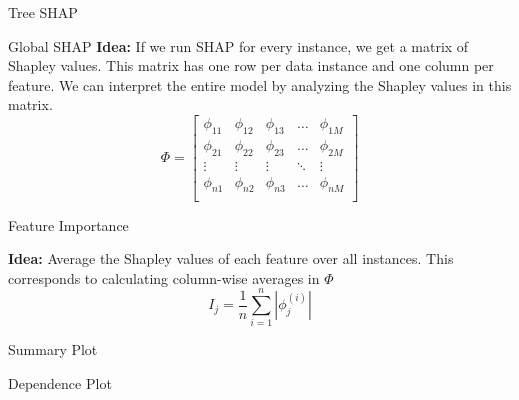 \documentclass[10pt,compress,t,notes=noshow, xcolor=table]{beamer}
\begin{document}
\begin{vbframe}{Tree SHAP}

\end{vbframe}

 \begin{vbframe}{Global SHAP}
\textbf{Idea: }
If we run SHAP for every instance, we get a matrix of Shapley values. This matrix has one row per data instance and one column per feature. We can interpret the entire model by analyzing the Shapley values in this matrix.
\vspace{2cm}
$$
\Phi =
\begin{bmatrix}
    \phi_{11} & \phi_{12} & \phi_{13} & \dots  & \phi_{1M} \\
    \phi_{21} & \phi_{22} & \phi_{23} & \dots  & \phi_{2M} \\
    \vdots & \vdots & \vdots & \ddots & \vdots \\
    \phi_{n1} & \phi_{n2} & \phi_{n3} & \dots  & \phi_{nM} \\
\end{bmatrix}
$$

 \end{vbframe}

 \begin{vbframe}{Feature Importance}
 
\textbf{Idea:} Average the Shapley values of each feature over all instances. This corresponds to calculating column-wise averages in $\Phi$
$$
I_{j}=\frac{1}{n} \sum_{i=1}^{n}\left|\phi_{j}^{(i)}\right|
$$
\end{vbframe}
 
\begin{vbframe}{Summary Plot}
\end{vbframe} 

\begin{vbframe}{Dependence Plot}
\end{vbframe}
\end{document}
